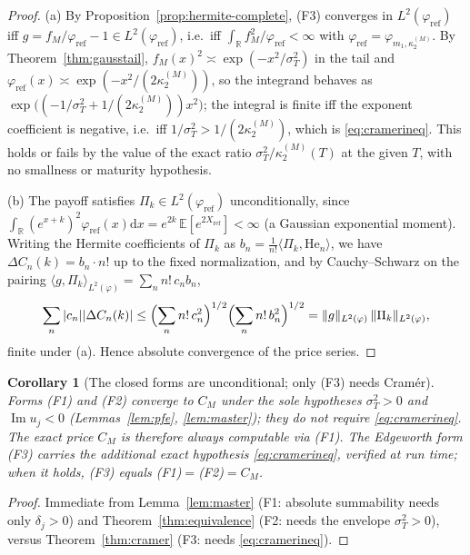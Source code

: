 \documentclass[11pt]{article}
\DeclareMathOperator{\Imag}{Im}
\newcommand{\R}{\mathbb{R}}
\newcommand{\dd}{\mathrm{d}}
\newcommand{\Herm}{\mathrm{He}}
\theoremstyle{plain}
\newtheorem{corollary}[theorem]{Corollary}
\theoremstyle{definition}
\theoremstyle{remark}
\begin{document}
\begin{proof}
(a) By Proposition~\ref{prop:hermite-complete}, \textup{(F3)} converges in
$L^2(\varphi_{\mathrm{ref}})$ iff $g=f_M/\varphi_{\mathrm{ref}}-1\in
L^2(\varphi_{\mathrm{ref}})$, i.e.\ iff $\int_\R f_M^2/\varphi_{\mathrm{ref}}<\infty$
with $\varphi_{\mathrm{ref}}=\varphi_{m_1,\kappa_2^{(M)}}$. By
Theorem~\ref{thm:gausstail}, $f_M(x)^2\asymp\exp(-x^2/\sigma_T^2)$ in the tail and
$\varphi_{\mathrm{ref}}(x)\asymp\exp(-x^2/(2\kappa_2^{(M)}))$, so the integrand
behaves as $\exp\bigl((-1/\sigma_T^2+1/(2\kappa_2^{(M)}))x^2\bigr)$; the integral is
finite iff the exponent coefficient is negative, i.e.\ iff
$1/\sigma_T^2>1/(2\kappa_2^{(M)})$, which is \eqref{eq:cramerineq}. This holds or
fails by the value of the exact ratio $\sigma_T^2/\kappa_2^{(M)}(T)$ at the given
$T$, with no smallness or maturity hypothesis.

(b) The payoff satisfies $\Pi_k\in L^2(\varphi_{\mathrm{ref}})$ unconditionally,
since $\int_\R (e^{x+k})^2\varphi_{\mathrm{ref}}(x)\dd x=e^{2k}\,
\mathbb E[e^{2X_{\mathrm{ref}}}]<\infty$ (a Gaussian exponential moment). Writing
the Hermite coefficients of $\Pi_k$ as $b_n=\frac1{n!}\langle\Pi_k,\Herm_n\rangle$,
we have $\Delta C_n(k)=b_n\cdot n!$ up to the fixed normalization, and by
Cauchy--Schwarz on the pairing $\langle g,\Pi_k\rangle_{L^2(\varphi)}=\sum_n
n!\,c_n b_n$,
\[
   \sum_n|c_n||\Delta C_n(k)|\le\Bigl(\sum_n n!\,c_n^2\Bigr)^{1/2}
   \Bigl(\sum_n n!\,b_n^2\Bigr)^{1/2}
   =\|g\|_{L^2(\varphi)}\,\|\Pi_k\|_{L^2(\varphi)},
\]
finite under (a). Hence absolute convergence of the price series.
\end{proof}

\begin{corollary}[The closed forms are unconditional; only \textup{(F3)} needs Cramér]
\label{cor:uncond}
Forms \textup{(F1)} and \textup{(F2)} converge to $C_M$ under the sole hypotheses
$\sigma_T^2>0$ and $\Imag u_j<0$ (Lemmas~\ref{lem:pfe}, \ref{lem:master}); they do
\emph{not} require \eqref{eq:cramerineq}. The exact price $C_M$ is therefore always
computable via \textup{(F1)}. The Edgeworth form \textup{(F3)} carries the
additional exact hypothesis \eqref{eq:cramerineq}, verified at run time; when it
holds, \textup{(F3)} equals \textup{(F1)}$=$\textup{(F2)}$=C_M$.
\end{corollary}
\begin{proof}
Immediate from Lemma~\ref{lem:master} (F1: absolute summability needs only
$\delta_j>0$) and Theorem~\ref{thm:equivalence} (F2: needs the envelope
$\sigma_T^2>0$), versus Theorem~\ref{thm:cramer} (F3: needs
\eqref{eq:cramerineq}).
\end{proof}
\end{document}
